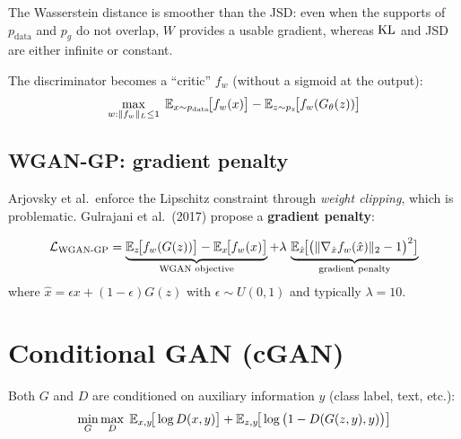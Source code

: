 \begin{intuition}
The Wasserstein distance is smoother than the JSD: even when the supports of $p_{\text{data}}$ and $p_g$ do not overlap, $W$ provides a usable gradient, whereas $\mathrm{KL}$ and JSD are either infinite or constant.
\end{intuition}

\begin{keyformulas}[title=\textbf{WGAN objective}]
The discriminator becomes a ``critic'' $f_w$ (without a sigmoid at the output):
\begin{equation}
\max_{w : \|f_w\|_L \leq 1} \; \mathbb{E}_{x \sim p_{\text{data}}}\!\big[f_w(x)\big] - \mathbb{E}_{z \sim p_z}\!\big[f_w(G_\theta(z))\big]
\label{eq:wgan-objective}
\end{equation}
\end{keyformulas}

\subsection{WGAN-GP: gradient penalty}
\label{sec:wgan-gp}

Arjovsky et al.\ enforce the Lipschitz constraint through \emph{weight clipping}, which is problematic. Gulrajani et al.\ (2017) propose a \textbf{gradient penalty}:

\begin{keyformulas}[title=\textbf{WGAN-GP}]
\begin{equation}
\mathcal{L}_{\text{WGAN-GP}} = \underbrace{\mathbb{E}_{z}\!\big[f_w(G(z))\big] - \mathbb{E}_{x}\!\big[f_w(x)\big]}_{\text{WGAN objective}} + \lambda \,\underbrace{\mathbb{E}_{\hat{x}}\!\big[\big(\|\nabla_{\hat{x}} f_w(\hat{x})\|_2 - 1\big)^2\big]}_{\text{gradient penalty}}
\label{eq:wgan-gp}
\end{equation}
where $\hat{x} = \epsilon x + (1 - \epsilon) G(z)$ with $\epsilon \sim U(0, 1)$ and typically $\lambda = 10$.
\end{keyformulas}

\section{Conditional GAN (cGAN)}
\label{sec:cgan}

\begin{definition}
Both $G$ and $D$ are conditioned on auxiliary information $y$ (class label, text, etc.):
\begin{equation}
\min_G \max_D \; \mathbb{E}_{x, y}\!\big[\log D(x, y)\big] + \mathbb{E}_{z, y}\!\big[\log\big(1 - D(G(z, y), y)\big)\big]
\end{equation}
\end{definition}


